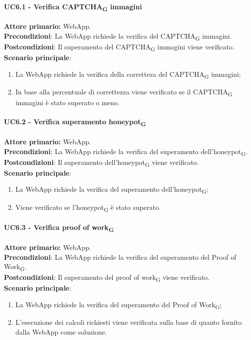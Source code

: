 \paragraph{UC6.1 - Verifica CAPTCHA\textsubscript{G} immagini}
\textbf{Attore primario:} WebApp.\\
\textbf{Precondizioni}: La WebApp richiede la verifica del CAPTCHA\textsubscript{G} immagini.\\
\textbf{Postcondizioni}: Il superamento del CAPTCHA\textsubscript{G} immagini viene verificato.\\

\textbf{Scenario principale}:
\begin{enumerate}
    \item La WebApp richiede la verifica della corretteza del CAPTCHA\textsubscript{G} immagini;
    \item In base alla percentuale di correttezza viene verificato se il CAPTCHA\textsubscript{G} immagini è stato superato o meno.
\end{enumerate}

\paragraph{UC6.2 - Verifica superamento honeypot\textsubscript{G}}
\textbf{Attore primario:} WebApp.\\
\textbf{Precondizioni}: La WebApp richiede la verifica del superamento dell'honeypot\textsubscript{G}.\\
\textbf{Postcondizioni}: Il superamento dell'honeypot\textsubscript{G} viene verificato.\\

\textbf{Scenario principale}:
\begin{enumerate}
    \item La WebApp richiede la verifica del superamento dell'honeypot\textsubscript{G};
    \item Viene verificato se l'honeypot\textsubscript{G} è stato superato.
\end{enumerate}

\paragraph{UC6.3 - Verifica proof of work\textsubscript{G}}
\textbf{Attore primario:} WebApp.\\
\textbf{Precondizioni}: La WebApp richiede la verifica del superamento del Proof of Work\textsubscript{G}.\\
\textbf{Postcondizioni}: Il superamento del proof of work\textsubscript{G} viene verificato.\\

\textbf{Scenario principale}:
\begin{enumerate}
    \item La WebApp richiede la verifica del superamento del Proof of Work\textsubscript{G};
    \item L'esecuzione dei calcoli richiesti viene verificata sulla base di quanto fornito dalla WebApp come soluzione.
\end{enumerate}
